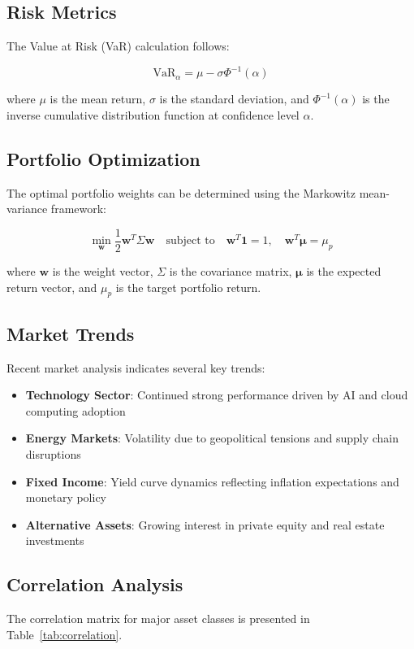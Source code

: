 \subsection{Risk Metrics}
The Value at Risk (VaR) calculation follows:

\begin{equation}
\text{VaR}_{\alpha} = \mu - \sigma \Phi^{-1}(\alpha)
\label{eq:var}
\end{equation}

where $\mu$ is the mean return, $\sigma$ is the standard deviation, and $\Phi^{-1}(\alpha)$ 
is the inverse cumulative distribution function at confidence level $\alpha$.

\subsection{Portfolio Optimization}
The optimal portfolio weights can be determined using the Markowitz mean-variance framework:

\begin{equation}
\min_{\mathbf{w}} \frac{1}{2}\mathbf{w}^T\Sigma\mathbf{w} \quad \text{subject to} \quad \mathbf{w}^T\mathbf{1} = 1, \quad \mathbf{w}^T\boldsymbol{\mu} = \mu_p
\label{eq:markowitz}
\end{equation}

where $\mathbf{w}$ is the weight vector, $\Sigma$ is the covariance matrix, 
$\boldsymbol{\mu}$ is the expected return vector, and $\mu_p$ is the target portfolio return.

\subsection{Market Trends}
Recent market analysis indicates several key trends:

\begin{itemize}
\item \textbf{Technology Sector}: Continued strong performance driven by AI and cloud computing adoption
\item \textbf{Energy Markets}: Volatility due to geopolitical tensions and supply chain disruptions
\item \textbf{Fixed Income}: Yield curve dynamics reflecting inflation expectations and monetary policy
\item \textbf{Alternative Assets}: Growing interest in private equity and real estate investments
\end{itemize}

\subsection{Correlation Analysis}
The correlation matrix for major asset classes is presented in Table~\ref{tab:correlation}.

